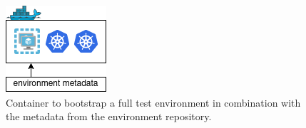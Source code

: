 \documentclass[../main.tex]{subfiles}
\begin{document}
    \begin{figure}[h]
        \centering
        \includegraphics[width=.4\linewidth]{img/out_test_env_container_v2.png}
        \captionsetup{justification=centering}
        \caption{
            Container to bootstrap a full test environment in combination with the metadata from the environment repository.
        }
        \label{fig:tes_env_container}
    \end{figure}
\end{document}
